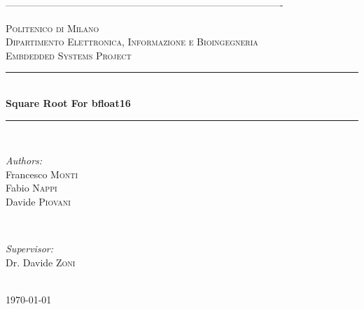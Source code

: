 \documentclass[12pt]{article}
\begin{document}
\begin{titlepage}

\newcommand{\HRule}{\rule{\linewidth}{0.5mm}} 

\center
-------------------------------------------------------------------------------------

\textsc{\LARGE Politenico di Milano}\\[1cm]
\textsc{\Large Dipartimento Elettronica, Informazione e Bioingegneria}\\[0.5cm] 
\textsc{\large Embdedded Systems Project}\\[0.5cm] 


\HRule \\[0.4cm]
{ \huge \bfseries Square Root For bfloat16}\\[0.4cm]
\HRule \\[1.5cm]
 

\begin{minipage}{0.4\textwidth}
\begin{flushleft} \large
\emph{Authors:}\\
Francesco \textsc{Monti} \\
Fabio \textsc{Nappi} \\
Davide \textsc{Piovani} 
\end{flushleft}
\end{minipage}
~
\begin{minipage}{0.4\textwidth}
\begin{flushright} \large
\emph{Supervisor:} \\
Dr. Davide \textsc{Zoni}
\end{flushright}
\end{minipage}\\[1.5cm]



{\large \today}\\[2cm] 


\end{titlepage}
\end{document}
